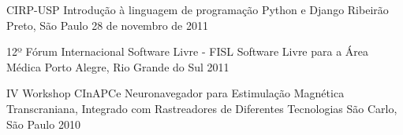 \begin{cventries}
  \cventry
    {CIRP-USP}
    {Introdução à linguagem de programação Python e Django}
    {Ribeirão Preto, São Paulo}
    {28 de novembro de 2011}
    {}
    
   \cventry
    {12º Fórum Internacional Software Livre - FISL}
    {Software Livre para a Área Médica}
    {Porto Alegre, Rio Grande do Sul}
    {2011}
    {}
    
   \cventry
   {IV Workshop CInAPCe}
   {Neuronavegador para Estimulação Magnética Transcraniana, Integrado com Rastreadores de Diferentes Tecnologias}
   {São Carlo, São Paulo}
   {2010}
   {}
\end{cventries}

